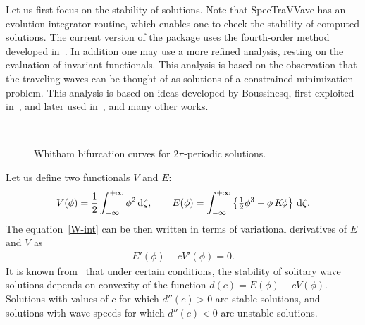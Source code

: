 Let us first focus on the stability of solutions.
Note that \textsf{SpecTraVVave} has an evolution integrator routine, 
which enables one to check the stability of computed solutions. 	
The current version of the package uses the fourth-order method developed in~\cite{dFSS}.
In addition one may use a more refined analysis, resting on the evaluation
of invariant functionals. This analysis is based on the observation
that the traveling waves can be thought of as solutions of a constrained
minimization problem. This analysis is based on ideas developed by
Boussinesq, first exploited in~\cite{B2}, and later used 
in~\cite{BSS,TJB,NgK}, and many other works.
\begin{figure}[ht]
\centering
{}%
~%
\caption{\small
Whitham bifurcation curves for $2\pi$-periodic solutions. 
}
\label{bif-L2-1024}
\end{figure} 
Let us define two functionals $V$ and $E$:
\begin{align*}
	V( \phi) = \frac{1}{2} \int_{-\infty}^{+\infty} \phi^2\,\mathrm{d}\zeta, \qquad
	E( \phi) = \int_{-\infty}^{+\infty} \left\{ {\textstyle{\frac{1}{2}}} \phi^3 - \phi \, K\!  \phi \right\}\, \mathrm{d}\zeta.
\end{align*}
The equation~\eqref{W-int} can be then written in terms of variational derivatives of $E$ and $V$
as
\begin{align}
	E' ( \phi ) - c V ' ( \phi ) = 0.
\label{zero}
\end{align} 
It is known from~\cite{BSS} that under certain conditions,
the stability of solitary wave solutions depends 
on convexity of the function $d(c) = E(\phi) - c V(\phi)$. 
Solutions with values of $c$ for which $d''(c) > 0$  are stable solutions,
and solutions with wave speeds for which $d''(c) <0$ are unstable solutions.
	
